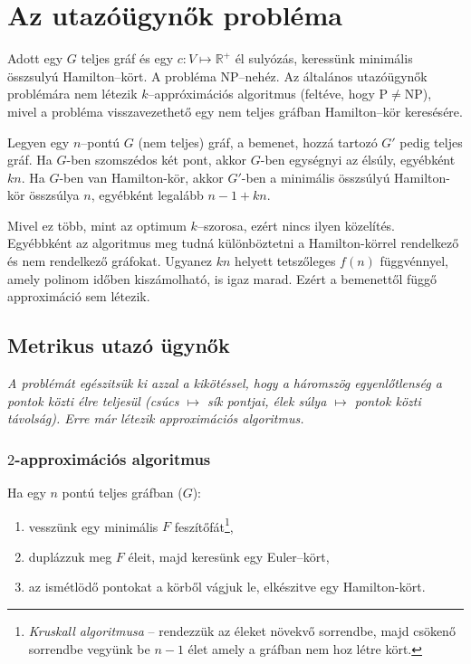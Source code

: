 \newpage
\section{Az utazóügynők probléma}

Adott egy $G$ teljes gráf és egy $c:V \mapsto \mathbb{R}^+$ él sulyózás,
keressünk minimális összsulyú Hamilton--kört. A probléma NP--nehéz. Az általános
utazóügynők problémára nem létezik $k$--appróximációs algoritmus (feltéve, hogy
P$\ne$NP), mivel a probléma visszavezethető egy nem teljes gráfban Hamilton--kör
keresésére.

Legyen egy $n$--pontú $G$ (nem teljes) gráf, a bemenet, hozzá tartozó $G'$ pedig
teljes gráf. Ha $G$-ben szomszédos két pont, akkor $G$-ben egységnyi az élsúly,
egyébként $kn$. Ha $G$-ben van Hamilton-kör, akkor $G'$-ben a minimális
összsúlyú Hamilton-kör összsúlya $n$, egyébként legalább $n-1+kn$. 

Mivel ez több, mint az optimum $k$--szorosa, ezért nincs ilyen közelítés.
Egyébbként az algoritmus meg tudná különböztetni a Hamilton-körrel rendelkező és
nem rendelkező gráfokat. Ugyanez $kn$ helyett tetszőleges $f(n)$ függvénnyel,
amely polinom időben kiszámolható, is igaz marad. Ezért a bemenettől függő
approximáció sem létezik.

\subsection{Metrikus utazó ügynők}

\emph{A problémát egészitsük ki azzal a kikötéssel, hogy a háromszög
egyenlőtlenség a pontok közti élre teljesül (csúcs $\mapsto$ sík pontjai, élek
súlya $\mapsto$ pontok közti távolság). Erre már létezik approximációs
algoritmus.}

\subsubsection{$2$-approximációs algoritmus}

Ha egy $n$ pontú teljes gráfban ($G$):
\begin{enumerate}
  \item vesszünk egy minimális $F$ feszítőfát\footnote{\emph{Kruskall algoritmusa} -- 
rendezzük az éleket növekvő sorrendbe, majd csökenő sorrendbe vegyünk be $n-1$ élet
amely a gráfban nem hoz létre kört.},
  \item duplázzuk meg $F$ éleit, majd keresünk egy Euler--kört,
  \item az ismétlödő pontokat a körből vágjuk le, elkészitve egy Hamilton-kört.
\end{enumerate}

